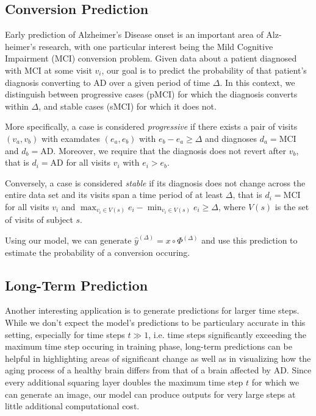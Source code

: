 \subsection{Conversion Prediction} \label{sec:appconvpred}
Early prediction of Alzheimer's Disease onset is an important area of Alz-heimer's research, with one particular interest being the Mild Cognitive Impairment (MCI) conversion problem. Given data about a patient diagnosed with MCI at some visit $v_i$, our goal is to predict the probability of that patient's diagnosis converting to AD over a given period of time $ \Delta $. 
In this context, we distinguish between progressive cases (pMCI) for which the diagnosis converts within $\Delta$, and stable cases (sMCI) for which it does not.

More specifically, a case is considered \textit{progressive} if there exists a pair of visits $(v_a, v_b)$ with examdates $(e_a, e_b)$ with $ e_b - e_a \geq \Delta $ and diagnoses $d_a = \text{MCI} $ and $d_b = \text{AD} $. Moreover, we require that the diagnosis does not revert after $v_b$, that is $ d_i = \text{AD} $ for all visits $v_i$ with $e_i > e_b$.

Conversely, a case is considered \textit{stable} if its diagnosis does not change across the entire data set and its visits span a time period of at least $\Delta$, that is $ d_i = \text{MCI} $ for all visits $v_i$ and $ { \max_{v_i \in V(s)} e_i -  \min_{v_i \in V(s)} e_i \geq \Delta } $, where $V(s)$ is the set of visits of subject $s$.

Using our model, we can generate $\hat y^{(\Delta)} = x \circ \Phi^{(\Delta)}$ and use this prediction to estimate the probability of a conversion occuring.

\subsection{Long-Term Prediction}
\label{sec:applongterm}
Another interesting application is to generate predictions for larger time steps. While we don't expect the model's predictions to be particulary accurate in this setting, especially for time steps $t \gg 1$, i.e. time steps significantly exceeding the maximum time step occuring in training phase, long-term predictions can be helpful in highlighting areas of significant change as well as in visualizing how the aging process of a healthy brain differs from that of a brain affected by AD. Since every additional squaring layer doubles the maximum time step $t$ for which we can generate an image, our model can produce outputs for very large steps at little additional computational cost.

